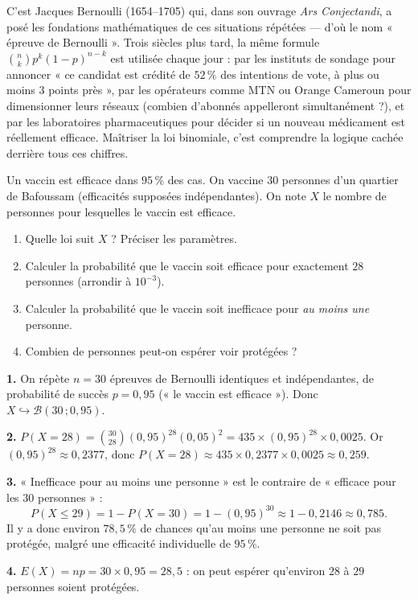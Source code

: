 \documentclass[11pt]{article}
\begin{document}
\begin{savaistu}
C'est Jacques Bernoulli (1654--1705) qui, dans son ouvrage \emph{Ars Conjectandi}, a posé les fondations mathématiques de ces situations répétées — d'où le nom « épreuve de Bernoulli ». Trois siècles plus tard, la même formule $\binom{n}{k}p^k(1-p)^{n-k}$ est utilisée chaque jour : par les instituts de sondage pour annoncer « ce candidat est crédité de $52\,\%$ des intentions de vote, à plus ou moins $3$ points près », par les opérateurs comme MTN ou Orange Cameroun pour dimensionner leurs réseaux (combien d'abonnés appelleront simultanément ?), et par les laboratoires pharmaceutiques pour décider si un nouveau médicament est réellement efficace. Maîtriser la loi binomiale, c'est comprendre la logique cachée derrière tous ces chiffres.
\end{savaistu}

\begin{exercice}
Un vaccin est efficace dans $95\,\%$ des cas. On vaccine $30$ personnes d'un quartier de Bafoussam (efficacités supposées indépendantes). On note $X$ le nombre de personnes pour lesquelles le vaccin est efficace.
\begin{enumerate}
\item Quelle loi suit $X$ ? Préciser les paramètres.
\item Calculer la probabilité que le vaccin soit efficace pour exactement $28$ personnes (arrondir à $10^{-3}$).
\item Calculer la probabilité que le vaccin soit inefficace pour \emph{au moins une} personne.
\item Combien de personnes peut-on espérer voir protégées ?
\end{enumerate}
\end{exercice}

\begin{corrige}[Exercice]
\textbf{1.} On répète $n = 30$ épreuves de Bernoulli identiques et indépendantes, de probabilité de succès $p = 0{,}95$ (« le vaccin est efficace »). Donc $X \hookrightarrow \mathcal{B}(30\,;0{,}95)$.

\textbf{2.} $P(X = 28) = \binom{30}{28}(0{,}95)^{28}(0{,}05)^{2} = 435 \times (0{,}95)^{28} \times 0{,}0025$. Or $(0{,}95)^{28} \approx 0{,}2377$, donc $P(X=28) \approx 435 \times 0{,}2377 \times 0{,}0025 \approx 0{,}259$.

\textbf{3.} « Inefficace pour au moins une personne » est le contraire de « efficace pour les $30$ personnes » :
\[ P(X \leq 29) = 1 - P(X = 30) = 1 - (0{,}95)^{30} \approx 1 - 0{,}2146 \approx 0{,}785. \]
Il y a donc environ $78{,}5\,\%$ de chances qu'au moins une personne ne soit pas protégée, malgré une efficacité individuelle de $95\,\%$.

\textbf{4.} $E(X) = np = 30 \times 0{,}95 = 28{,}5$ : on peut espérer qu'environ $28$ à $29$ personnes soient protégées.
\end{corrige}
\end{document}
